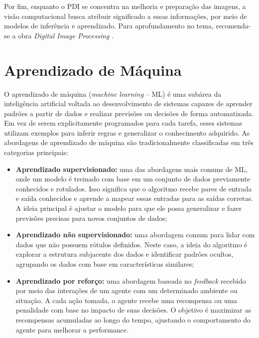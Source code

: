 Por fim, enquanto o \acs{PDI} se concentra na melhoria e preparação das imagens, a visão computacional busca atribuir significado a essas informações, por meio de modelos de inferência e aprendizado. Para aprofundamento no tema, recomenda-se a obra \textit{Digital Image Processing} \cite{gonzalez2010}.

\section{Aprendizado de Máquina}

O aprendizado de máquina (\textit{machine learning} – \acs{ML}) é uma subárea da inteligência artificial voltada ao desenvolvimento de sistemas capazes de aprender padrões a partir de dados e realizar previsões ou decisões de forma automatizada. Em vez de serem explicitamente programados para cada tarefa, esses sistemas utilizam exemplos para inferir regras e generalizar o conhecimento adquirido. As abordagens de aprendizado de máquina são tradicionalmente classificadas em três categorias principais:

\begin{itemize}
    \item \textbf{Aprendizado supervisionado:} uma das abordagens mais comuns de \acs{ML}, onde um modelo é treinado com base em um conjunto de dados previamente conhecidos e rotulados. Isso significa que o algoritmo recebe pares de entrada e saída conhecidos e aprende a mapear essas entradas para as saídas corretas. A ideia principal é ajustar o modelo para que ele possa generalizar e fazer previsões precisas para novos conjuntos de dados;
    
    \item \textbf{Aprendizado não supervisionado:} uma abordagem comum para lidar com dados que não possuem rótulos definidos. Neste caso, a ideia do algoritmo é explorar a estrutura subjacente dos dados e identificar padrões ocultos, agrupando os dados com base em características similares;
	
    \item \textbf{Aprendizado por reforço:} uma abordagem baseada no \textit{feedback} recebido por meio das interações de um agente com um determinado ambiente ou situação. A cada ação tomada, o agente recebe uma recompensa ou uma penalidade com base no impacto de suas decisões. O objetivo é maximizar as recompensas acumuladas ao longo do tempo, ajustando o comportamento do agente para melhorar a performance. 
\end{itemize}

